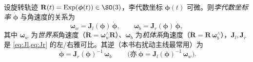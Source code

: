 \begin{theorem}[旋转运动学的李代数形式：$\boldsymbol{\omega}=\mathbf{J}\dot{\boldsymbol{\phi}}$]\label{thm:so3-kinematics}
设旋转轨迹 $\mathbf{R}(t)=\mathrm{Exp}(\boldsymbol{\phi}(t))\in\SO(3)$，李代数坐标 $\boldsymbol{\phi}(t)$ 可微。则\emph{李代数坐标率} $\dot{\boldsymbol{\phi}}$ 与角速度的关系为
\begin{equation}
  \boldsymbol{\omega}_w=\mathbf{J}_l(\boldsymbol{\phi})\,\dot{\boldsymbol{\phi}},\qquad
  \boldsymbol{\omega}_b=\mathbf{J}_r(\boldsymbol{\phi})\,\dot{\boldsymbol{\phi}},
  \label{eq:so3-kinematics}
\end{equation}
其中 $\boldsymbol{\omega}_w$ 为\emph{世界系}角速度（$\dot{\mathbf{R}}=\boldsymbol{\omega}_w^\wedge\mathbf{R}$）、$\boldsymbol{\omega}_b$ 为\emph{机体系}角速度（$\dot{\mathbf{R}}=\mathbf{R}\,\boldsymbol{\omega}_b^\wedge$），$\mathbf{J}_l,\mathbf{J}_r$ 是 \cref{eq:Jl,eq:Jr} 的左/右雅可比。其逆（本书右扰动主线最常用）为
\begin{equation}
  \boxed{\;\dot{\boldsymbol{\phi}}=\mathbf{J}_r(\boldsymbol{\phi})^{-1}\,\boldsymbol{\omega}_b\;}\qquad\big(\text{亦}\ \dot{\boldsymbol{\phi}}=\mathbf{J}_l(\boldsymbol{\phi})^{-1}\,\boldsymbol{\omega}_w\big).
  \label{eq:so3-kinematics-inv}
\end{equation}
\end{theorem}

